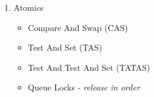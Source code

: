 \documentclass[12pt]{article}
\newenvironment{QandA}{\begin{enumerate}[label=\bfseries\arabic*.]\bfseries}
                      {\end{enumerate}}
\newenvironment{answered}{\par\quad\normalfont}{}
\begin{document}
\begin{QandA}
\begin{answered}
\textit{Note:} Always acquire multiple locks in the same order. Acquiring locks in random order increases the risk of arriving at a deadlock condition - \textit{Dining Philosophers}. 
\end{answered}

\ 

\item Atomics
\begin{answered}
\vspace{-0.85cm}
\begin{itemize}
    \item Compare And Swap (CAS)
    \item Test And Set (TAS)
    \item Test And Test And Set (TATAS)
    \item Queue Locks - \textit{release in order} 
\end{itemize}
\end{answered}

\end{QandA}

\newpage
\end{document}
